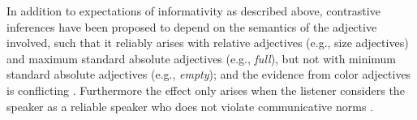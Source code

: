 \documentclass[10pt,letterpaper]{article}
\newcommand{\ek}[1]{\textcolor{Orange}{[ek: #1]}}
\newcommand{\jd}[1]{\textcolor{Purple}{[jd: #1]}}
\begin{document}
In addition to expectations of informativity as described above, contrastive inferences have been proposed to depend on the semantics of the adjective involved, such that it reliably arises with relative adjectives (e.g., size adjectives) and maximum standard absolute adjectives (e.g., \textit{full}), but not  with minimum standard absolute adjectives (e.g., \textit{empty}); and the evidence from color adjectives is conflicting \cite{Aparicio:2018,Sedivy:2003}. Furthermore the effect only arises when the listener considers the speaker as a reliable speaker who does not violate communicative norms \cite{Grodner:2011,Ryskin:2019}.
\end{document}
